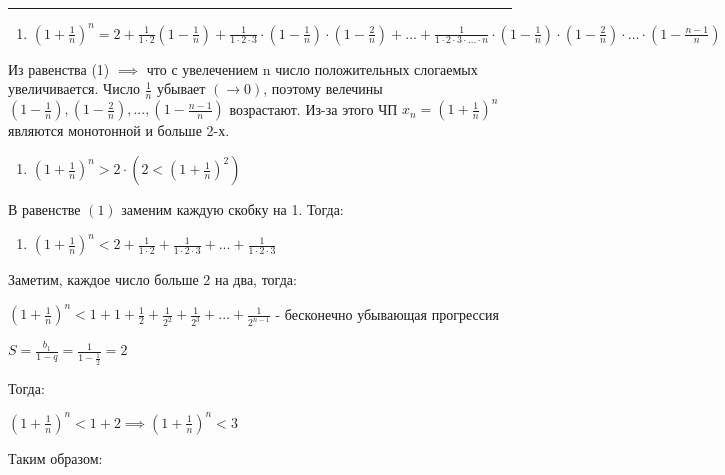 \documentclass[12pt, a4paper]{article}
\theoremstyle{remark}
\begin{document}
	\vspace{0.5cm} 
	\hrule
	
	\begin{enumerate}[label=(\arabic*), start = 1]
		\item $(1 + \frac{1}{n})^{n} = 2 + \frac{1}{1 \cdot 2} (1 - \frac{1}{n}) + \frac{1}{1 \cdot 2 \cdot 3} \cdot (1 - \frac{1}{n}) \cdot (1 - \frac{2}{n}) + ... + \frac{1}{1 \cdot 2 \cdot 3 \cdot ... \cdot n} \cdot (1 - \frac{1}{n}) \cdot (1 - \frac{2}{n}) \cdot ... \cdot (1 - \frac{n - 1}{n})$
	\end{enumerate}
	
	Из равенства (1) $\implies$ что с увелечением n число положительных слогаемых увеличивается. Число $\frac{1}{n}$ убывает $(\to 0)$, поэтому велечины $(1 - \frac{1}{n}), (1 - \frac{2}{n}), ... , (1 - \frac{n - 1}{n})$ возрастают. Из-за этого ЧП $x_n = (1 + \frac{1}{n})^{n}$ являются монотонной и больше 2-х.  
	
	\begin{enumerate}[label=(\arabic*), start = 2]
		\item $(1 + \frac{1}{n})^n > 2 \cdot (2 < (1 + \frac{1}{n})^2)$
	\end{enumerate}
	
	В равенстве $(1)$ заменим каждую скобку на 1. Тогда:
	
	\begin{enumerate}[label=(\arabic*), start = 3]
		\item $(1 + \frac{1}{n})^n < 2 + \frac{1}{1 \cdot 2} + \frac{1}{1 \cdot 2 \cdot 3} + ... + \frac{1}{1 \cdot 2 \cdot 3}$
	\end{enumerate}
	
	Заметим, каждое число больше 2 на два, тогда:
	\vspace{0.4cm}
	
	$(1+ \frac{1}{n})^n < 1 + 1 + \frac{1}{2} + \frac{1}{2^2} + \frac{1}{2^3} + ... + \frac{1}{2^{n-1}}$ - бесконечно убывающая прогрессия 
	\vspace{0.4cm}
	
	$S = \frac{b_1}{1 - q} = \frac{1}{1 - \frac{1}{2}} = 2$
	\vspace{0.4cm}
	
	Тогда:
	\vspace{0.4cm}
	
	$(1 + \frac{1}{n}) ^ n < 1 + 2 \implies (1 + \frac{1}{n})^n < 3$
	\vspace{0.4cm}
	
	Таким образом:
	\vspace{0.4cm}
	
\end{document}
